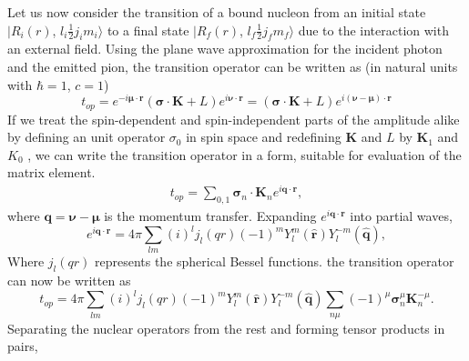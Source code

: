 Let us now consider the transition of a bound nucleon from an initial state $|R_i (r)$, $l_i \frac{1}{2} j_i m_i \rangle$ to a final state $|R_f (r)$, $l_f \frac{1}{2} j_f m_f \rangle$ due to the interaction with an external field. Using the plane wave approximation for the incident photon and the emitted pion, the transition operator can be written as (in natural units with $\hbar =1$, $c=1$)
\setcounter{equation}{36}
\begin{equation}
  t_{op}= e^{-i \boldsymbol{\mu \cdot r}} (\boldsymbol{\sigma \cdot K} + L)e^{i \boldsymbol{\nu \cdot r}}= (\boldsymbol{\sigma \cdot K}+ L) e^{i \boldsymbol{(\nu - \mu)\cdot r}} \label{chap3-eq37}
\end{equation}
If we treat the spin-dependent and spin-independent parts of the amplitude alike by defining an unit operator $\sigma_0$ in spin space and redefining ${\boldsymbol  K}$ and $L$ by ${\boldsymbol  K_1}$ and $K_0$ , we can write the transition operator in a form, suitable for evaluation of the matrix element.
\begin{align}
  t_{op} = \sum_{0, 1} \boldsymbol{\sigma}_n \cdot \boldsymbol{K}_n e^{i\boldsymbol{q \cdot r}}, \label{chap3-eq38}
\end{align}
where $\boldsymbol{q}= \boldsymbol{\nu- \mu}$ is the momentum transfer. Expanding $e^{i \boldsymbol{q \cdot r}}$ into partial waves,
\begin{equation}
  e^{i \boldsymbol{q \cdot r}} = 4 \pi \sum_{lm} (i)^l j_l (qr) (-1)^{m}Y_l^m (\hat{{\boldsymbol  r}}) Y_l^{-m} (\hat{{\boldsymbol  q}}), \label{chap3-eq39}
\end{equation}
Where $j_l (qr)$ represents the spherical Bessel functions. the transition operator can now be written as
\begin{equation}
 t_{op}= 4 \pi \sum_{lm} (i)^l j_l (qr) (-1)^m Y_l^m (\hat{{\boldsymbol  r}}) Y_l^{-m} (\hat{{\boldsymbol  q}}) \sum_{n\mu} (-1)^\mu {\boldsymbol \sigma}_n^\mu {\boldsymbol K}_n^{-\mu}. \label{chap3-eq40}
\end{equation}
Separating the nuclear operators from the rest and forming tensor products in pairs,
